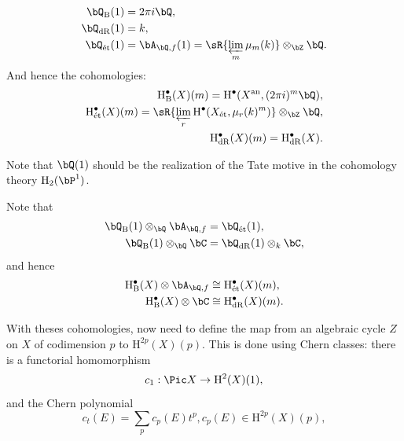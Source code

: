 \documentclass[a4paper, twoside]{article}
\begin{document}
\begin{dfn}
  \begin{align*}
	\bQ_{\mathrm{B}}(1)&=2\pi i\bQ,\\
	\bQ_{\mathrm{dR}}(1)&=k,\\
	\bQ_{\text{\'et}}(1)&=\bA_{\bQ,f}(1)=\sR{\varprojlim_{m}\mu_{m}(k)}\otimes_{\bZ}\bQ.\\
  \end{align*}
  And hence the cohomologies:
  \begin{align*}
	\mathrm{H}_{\mathrm{B}}^{\bullet}(X)(m)=\mathrm{H}_{~}^{\bullet}(X^{\mathrm{an}}, (2\pi i)^{m}\bQ),\\
	\mathrm{H}_{\text{\'et}}^{\bullet}(X)(m)=\sR{\varprojlim_{r}\mathrm{H}_{~}^{\bullet}(X_{\text{\'et}}, \mu_{r}(k)^{m})}\otimes_{\bZ}\bQ,\\
	\mathrm{H}_{\mathrm{dR}}^{\bullet}(X)(m)=\mathrm{H}_{\mathrm{dR}}^{\bullet}(X).\\
  \end{align*}

\end{dfn}

\begin{rmk}
  Note that $\bQ(1)$ should be the realization of the Tate motive in the cohomology theory $\mathrm{H}_{2}(\bP^{1})$.
\end{rmk}

\begin{thm}[Comparison]
  Note that
  \begin{align*}
	\bQ_{\mathrm{B}}(1)\otimes_{\bQ}\bA_{\bQ,f}&=\bQ_{\text{\'et}}(1),\\
	\bQ_{\mathrm{B}}(1)\otimes_{\bQ}\bC&=\bQ_{\mathrm{dR}}(1)\otimes_{k}\bC,\\
  \end{align*}
  and hence
  \begin{align*}
	\mathrm{H}_{\mathrm{B}}^{\bullet}(X)\otimes\bA_{\bQ,f}&\cong \mathrm{H}_{\text{\'et}}^{\bullet}(X)(m),\\
	\mathrm{H}_{\mathrm{B}}^{\bullet}(X)\otimes\bC&\cong \mathrm{H}_{\mathrm{dR}}^{\bullet}(X)(m).\\
  \end{align*}
\end{thm}


With theses cohomologies, now need to define the map from an algebraic cycle $Z$ on $X$ of codimension $p$ to $\mathrm{H}_{~}^{2p}(X)(p)$. This is done using Chern classes: there is a functorial homomorphism
\[
  c_{1}:\Pic X\rightarrow \mathrm{H}_{~}^{2}(X)(1),
\]
and the Chern polynomial
\[
  c_{t}(E)=\sum_{p}c_{p}(E)t^{p}, c_{p}(E)\in \mathrm{H}_{~}^{2p}(X)(p),
\]
\end{document}
